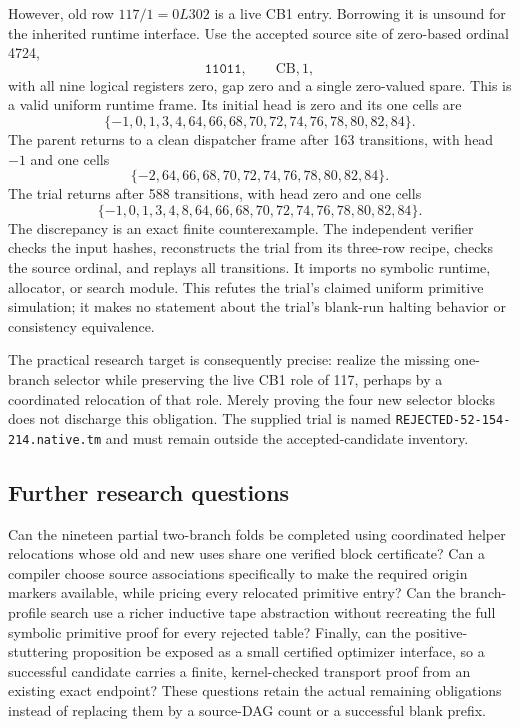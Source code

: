 However, old row $117/1=0L302$ is a live CB1 entry. Borrowing it is unsound for the inherited runtime interface. Use the accepted source site of zero-based ordinal 4724,
\[
 \texttt{11011},\qquad\mathrm{CB},1,
\]
with all nine logical registers zero, gap zero and a single zero-valued spare. This is a valid uniform runtime frame. Its initial head is zero and its one cells are
\[
 \{-1,0,1,3,4,64,66,68,70,72,74,76,78,80,82,84\}.
\]
The parent returns to a clean dispatcher frame after 163 transitions, with head $-1$ and one cells
\[
 \{-2,64,66,68,70,72,74,76,78,80,82,84\}.
\]
The trial returns after 588 transitions, with head zero and one cells
\[
 \{-1,0,1,3,4,8,64,66,68,70,72,74,76,78,80,82,84\}.
\]
The discrepancy is an exact finite counterexample. The independent verifier checks the input hashes, reconstructs the trial from its three-row recipe, checks the source ordinal, and replays all transitions. It imports no symbolic runtime, allocator, or search module. This refutes the trial's claimed uniform primitive simulation; it makes no statement about the trial's blank-run halting behavior or consistency equivalence.

The practical research target is consequently precise: realize the missing one-branch selector while preserving the live CB1 role of 117, perhaps by a coordinated relocation of that role. Merely proving the four new selector blocks does not discharge this obligation. The supplied trial is named \texttt{REJECTED-52-154-214.native.tm} and must remain outside the accepted-candidate inventory.

\subsection{Further research questions}

Can the nineteen partial two-branch folds be completed using coordinated helper relocations whose old and new uses share one verified block certificate? Can a compiler choose source associations specifically to make the required origin markers available, while pricing every relocated primitive entry? Can the branch-profile search use a richer inductive tape abstraction without recreating the full symbolic primitive proof for every rejected table? Finally, can the positive-stuttering proposition be exposed as a small certified optimizer interface, so a successful candidate carries a finite, kernel-checked transport proof from an existing exact endpoint? These questions retain the actual remaining obligations instead of replacing them by a source-DAG count or a successful blank prefix.
